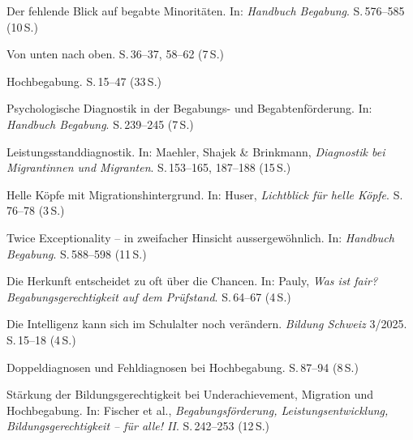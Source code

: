 \documentclass[ngerman, a4paper]{article}
\begin{document}
\begin{litdesc}
  \item[\cite{stamm2021fehlenderblick}] Der fehlende Blick auf begabte Minoritäten.
    In: \textit{Handbuch Begabung}.
    S.\,576--585 (10\,S.)

  \item[\cite{stamm2025vonuntennachoben}] Von unten nach oben.
    S.\,36--37, 58--62 (7\,S.)

  \item[\cite{preckel2013hochbegabung}] Hochbegabung.
    S.\,15--47 (33\,S.)

  \item[\cite{gauckreimann2021psychdiagnostik}] Psychologische Diagnostik in der Begabungs- und Begabtenförderung.
    In: \textit{Handbuch Begabung}.
    S.\,239--245 (7\,S.)

  \item[\cite{haag2018leistungsstanddiagnostik}] Leistungsstanddiagnostik.
    In: Maehler, Shajek \& Brinkmann, \textit{Diagnostik bei Migrantinnen und Migranten}.
    S.\,153--165, 187--188 (15\,S.)

  \item[\cite{kellerkoller2025hellekoepfe}] Helle Köpfe mit Migrationshintergrund.
    In: Huser, \textit{Lichtblick für helle Köpfe}.
    S.\,76--78 (3\,S.)

  \item[\cite{baumschader2021twice}] Twice Exceptionality -- in zweifacher Hinsicht aussergewöhnlich.
    In: \textit{Handbuch Begabung}.
    S.\,588--598 (11\,S.)

  \item[\cite{koop2025herkunft}] Die Herkunft entscheidet zu oft über die Chancen.
    In: Pauly, \textit{Was ist fair? Begabungsgerechtigkeit auf dem Prüfstand}.
    S.\,64--67 (4\,S.)

  \item[\cite{stern2025intelligenz}] Die Intelligenz kann sich im Schulalter noch verändern.
    \textit{Bildung Schweiz} 3/2025.
    S.\,15--18 (4\,S.)

  \item[\cite{webb2020doppeldiagnosen}] Doppeldiagnosen und Fehldiagnosen bei Hochbegabung.
    S.\,87--94 (8\,S.)

  \item[\cite{warneckehauke2020bildungsgerechtigkeit}] Stärkung der Bildungsgerechtigkeit bei Underachievement, Migration und Hochbegabung.
    In: Fischer et al., \textit{Begabungsförderung, Leistungsentwicklung, Bildungsgerechtigkeit -- für alle! II}.
    S.\,242--253 (12\,S.)


\end{litdesc}
\end{document}
